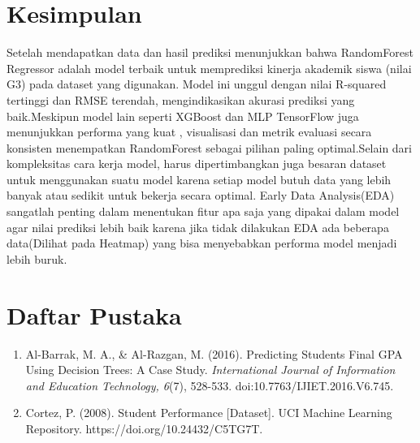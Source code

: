 \chapter*{Kesimpulan}

Setelah mendapatkan data dan hasil prediksi menunjukkan bahwa RandomForest Regressor adalah model terbaik untuk memprediksi kinerja akademik 
siswa (nilai G3) pada dataset yang digunakan. Model ini unggul dengan nilai R-squared tertinggi dan RMSE terendah, mengindikasikan akurasi 
prediksi yang baik.Meskipun model lain seperti XGBoost dan MLP TensorFlow juga menunjukkan performa yang kuat
, visualisasi dan metrik evaluasi secara konsisten menempatkan RandomForest sebagai pilihan paling optimal.Selain dari kompleksitas cara kerja  model, harus 
dipertimbangkan juga besaran dataset untuk menggunakan suatu model karena setiap model butuh data yang lebih banyak atau sedikit untuk bekerja secara optimal.
Early Data Analysis(EDA) sangatlah penting dalam menentukan fitur apa saja yang dipakai dalam model agar nilai prediksi lebih baik karena jika tidak 
dilakukan EDA ada beberapa data(Dilihat pada Heatmap) yang bisa menyebabkan performa model menjadi lebih buruk.

\chapter*{Daftar Pustaka}

\begin{enumerate}
    \item Al-Barrak, M. A., \& Al-Razgan, M. {(2016)}. Predicting Students Final GPA Using Decision Trees: A Case Study. \textit{International Journal of Information and Education Technology, 6}{(7)}, 528-533. doi:10.7763{/}IJIET.2016.V6.745.
    \item Cortez, P. (2008). Student Performance [Dataset]. UCI Machine Learning Repository. https://doi.org/10.24432/C5TG7T.
\end{enumerate}